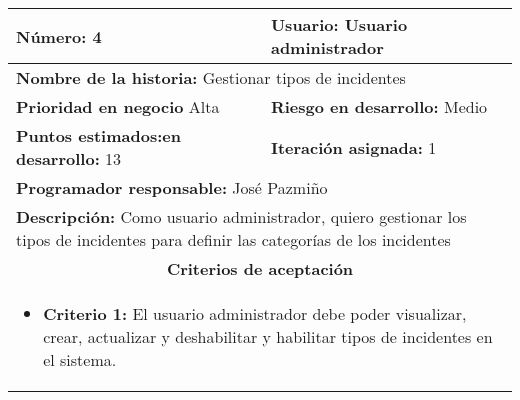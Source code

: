 \begin{longtable}{|p{6.7cm}|p{6.7cm}|}
    \textbf{Número:} 4                                   & \textbf{Usuario:} Usuario administrador                                                                         \\
    \hline
    \multicolumn{2}{|l|}{\textbf{Nombre de la historia:} Gestionar tipos de incidentes}                                                                                    \\
    \hline
    \textbf{Prioridad en negocio}  Alta                  & \textbf{Riesgo en desarrollo:} Medio                                                                            \\
    \hline
    \textbf{\textbf{Puntos estimados:}en desarrollo:} 13 & \textbf{Iteración asignada:} 1                                                                                  \\
    \hline
    \multicolumn{2}{|l|}{\textbf{Programador responsable:} José Pazmiño }                                                                                                  \\
    \hline
    \multicolumn{2}{|p{13.4cm}|}{\textbf{Descripción:} Como usuario administrador, quiero gestionar los tipos de incidentes para definir las categorías de los incidentes} \\
    \hline
    \multicolumn{2}{|c|}{\textbf{Criterios de aceptación}}                                                                                                                 \\
    \hline
    \multicolumn{2}{|p{13.4cm}|}{
    \begin{itemize}[label={},leftmargin=*, nosep]
        \item \textbf{Criterio 1:} El usuario administrador debe poder visualizar, crear, actualizar y deshabilitar y habilitar tipos de incidentes en el sistema.
    \end{itemize}
    }                                                                                                                                                                      \\
\end{longtable}



